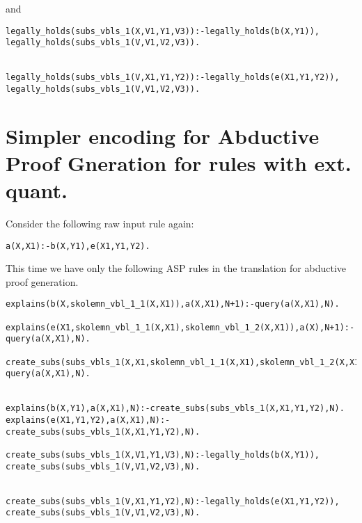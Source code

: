 \documentclass{article}
\begin{document}
and 

\begin{verbatim}
legally_holds(subs_vbls_1(X,V1,Y1,V3)):-legally_holds(b(X,Y1)),
legally_holds(subs_vbls_1(V,V1,V2,V3)).


legally_holds(subs_vbls_1(V,X1,Y1,Y2)):-legally_holds(e(X1,Y1,Y2)),
legally_holds(subs_vbls_1(V,V1,V2,V3)).

\end{verbatim}
\section{Simpler encoding for Abductive Proof Gneration for rules with ext. quant.}

Consider the following raw input rule again:
\begin{verbatim}
a(X,X1):-b(X,Y1),e(X1,Y1,Y2).
\end{verbatim}

This time we have only the following ASP rules in the translation for abductive proof generation.

\begin{verbatim}
explains(b(X,skolemn_vbl_1_1(X,X1)),a(X,X1),N+1):-query(a(X,X1),N).

explains(e(X1,skolemn_vbl_1_1(X,X1),skolemn_vbl_1_2(X,X1)),a(X),N+1):-query(a(X,X1),N).

create_subs(subs_vbls_1(X,X1,skolemn_vbl_1_1(X,X1),skolemn_vbl_1_2(X,X1)),N+1):-query(a(X,X1),N).


explains(b(X,Y1),a(X,X1),N):-create_subs(subs_vbls_1(X,X1,Y1,Y2),N).
explains(e(X1,Y1,Y2),a(X,X1),N):-create_subs(subs_vbls_1(X,X1,Y1,Y2),N).

create_subs(subs_vbls_1(X,V1,Y1,V3),N):-legally_holds(b(X,Y1)),
create_subs(subs_vbls_1(V,V1,V2,V3),N).


create_subs(subs_vbls_1(V,X1,Y1,Y2),N):-legally_holds(e(X1,Y1,Y2)),
create_subs(subs_vbls_1(V,V1,V2,V3),N).
    
\end{verbatim}
\end{document}

